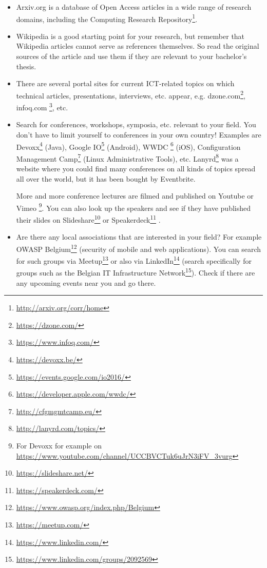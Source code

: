 \begin{itemize}
 \item Arxiv.org is a database of Open Access articles in a wide range of research domains, including the Computing Research Repository\footnote{\url{http://arxiv.org/corr/home}}.
 
 \item Wikipedia is a good starting point for your research, but remember that Wikipedia articles cannot serve as references themselves. So read the original sources of the article and use them if they are relevant to your bachelor's thesis.
 
 \item There are several portal sites for current ICT-related topics on which technical articles, presentations, interviews, etc. appear, e.g. dzone.com\footnote{\url{https://dzone.com/}}, infoq.com \footnote{\url{https://www.infoq.com/}}, etc.
 
 \item Search for conferences, workshops, symposia, etc. relevant to your field. You don't have to limit yourself to conferences in your own country! Examples are Devoxx\footnote{\url{https://devoxx.be/}} (Java), Google IO\footnote{\url{https://events.google.com/io2016/}} (Android), WWDC \footnote{\url{https://developer.apple.com/wwdc/}} (iOS), Configuration Management Camp\footnote{\url{http://cfgmgmtcamp.eu/}} (Linux Administrative Tools), etc. Lanyrd\footnote{\url{http://lanyrd.com/topics/}} was a website where you could find many conferences on all kinds of topics spread all over the world, but it has been bought by Eventbrite.
 
 More and more conference lectures are filmed and published on Youtube or Vimeo \footnote{For Devoxx for example on \url{https://www.youtube.com/channel/UCCBVCTuk6uJrN3iFV\_3vurg}}. You can also look up the speakers and see if they have published their slides on Slideshare\footnote{\url{https://slideshare.net/}} or Speakerdeck\footnote{\url{https://speakerdeck.com/}} .
 
   \item Are there any local associations that are interested in your field? For example OWASP Belgium\footnote{\url{https://www.owasp.org/index.php/Belgium}} (security of mobile and web applications). You can search for such groups via Meetup\footnote{\url{https://meetup.com/}} or also via LinkedIn\footnote{\url{https://www.linkedin.com/}} (search specifically for groups such as the Belgian IT Infrastructure Network\footnote{\url{https://www.linkedin.com/groups/2092569}}). Check if there are any upcoming events near you and go there.
  

\end{itemize}
